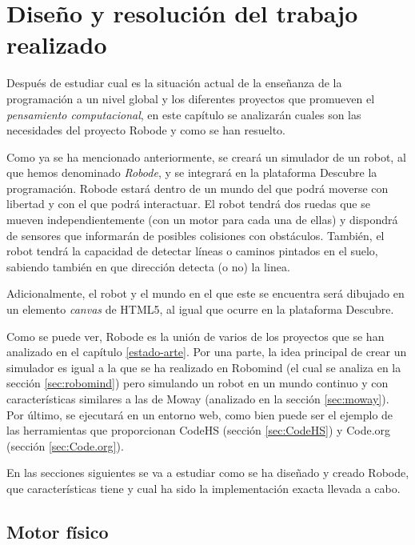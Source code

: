 \chapter{Diseño y resolución del trabajo realizado}
\label{diseno}

Después de estudiar cual es la situación actual de la enseñanza de la programación a un nivel global y los diferentes proyectos que promueven el \emph{pensamiento computacional}, en este capítulo se analizarán cuales son las necesidades del proyecto Robode y como se han resuelto.

Como ya se ha mencionado anteriormente, se creará un simulador de un robot, al que hemos denominado \emph{Robode}, y se integrará en la plataforma Descubre la programación. Robode  estará dentro de un mundo del que podrá moverse con libertad y con el que podrá interactuar. El robot tendrá dos ruedas que se mueven independientemente (con un motor para cada una de ellas) y dispondrá de sensores que informarán de posibles colisiones con obstáculos. También, el robot tendrá la capacidad de detectar líneas o caminos pintados en el suelo, sabiendo también en que dirección detecta (o no) la linea.

Adicionalmente, el robot y el mundo en el que este se encuentra será dibujado en un elemento \emph{canvas} de HTML5, al igual que ocurre en la plataforma Descubre.


Como se puede ver, Robode es la unión de varios de los proyectos que se han analizado en el capítulo \ref{estado-arte}. Por una parte, la idea principal de crear un simulador es igual a la que se ha realizado en Robomind (el cual se analiza en la sección \ref{sec:robomind}) pero simulando un robot en un mundo continuo y con características similares a las de Moway (analizado en la sección \ref{sec:moway}). Por último, se ejecutará en un entorno web, como bien puede ser el ejemplo de las herramientas que proporcionan CodeHS (sección \ref{sec:CodeHS}) y Code.org (sección \ref{sec:Code.org}). 


En las secciones siguientes se va a estudiar como se ha diseñado y creado Robode, que características tiene y cual ha sido la implementación exacta llevada a cabo.



\section{Motor físico}
\label{sec:motor-fisico}

